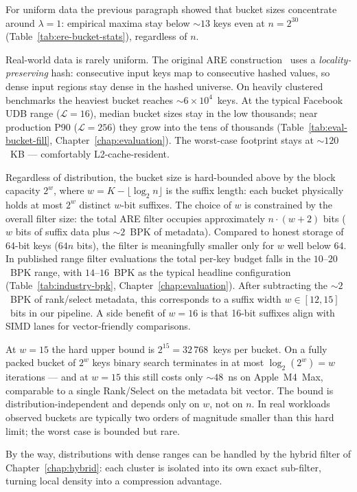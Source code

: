 For uniform data the previous paragraph showed that bucket sizes
concentrate around $\lambda = 1$: empirical maxima stay below
${\sim}13$ keys even at $n = 2^{30}$
(Table~\ref{tab:ere-bucket-stats}), regardless of $n$.

Real-world data is rarely uniform.
The original ARE construction~\citep{goswami2015approximate} uses a \emph{locality-preserving}
hash: consecutive input keys map to consecutive hashed values, so dense
input regions stay dense in the hashed universe.
On heavily clustered benchmarks the heaviest bucket reaches ${\sim}6 \times 10^4$~keys.
At the typical Facebook UDB range ($\mathcal{L} = 16$), median bucket
sizes stay in the low thousands; near production P90 ($\mathcal{L} = 256$)
they grow into the tens of thousands
(Table~\ref{tab:eval-bucket-fill}, Chapter~\ref{chap:evaluation}).
The worst-case footprint stays at ${\sim}120$~KB --- comfortably
L2-cache-resident.

Regardless of distribution, the bucket size is hard-bounded above by
the block capacity $2^w$, where $w = K - \lfloor \log_2 n \rfloor$ is
the suffix length: each bucket physically holds at most $2^w$ distinct
$w$-bit suffixes.
The choice of $w$ is constrained by the overall
filter size: the total ARE filter occupies approximately
$n \cdot (w + 2)$ bits ($w$ bits of suffix data plus ${\sim}2$~BPK of
metadata).
Compared to honest storage of 64-bit keys ($64 n$ bits),
the filter is meaningfully smaller only for $w$ well below $64$.
In published range filter evaluations the total per-key budget falls
in the $10$--$20$~BPK range, with $14$--$16$~BPK as the typical
headline configuration (Table~\ref{tab:industry-bpk},
Chapter~\ref{chap:evaluation}).
After subtracting the ${\sim}2$~BPK of rank/select metadata, this
corresponds to a suffix width $w \in [12, 15]$~bits in our pipeline.
A side benefit of $w = 16$ is that 16-bit suffixes align with SIMD
lanes for vector-friendly comparisons.

At $w = 15$ the hard upper bound is $2^{15} = 32\,768$~keys per bucket.
On a fully packed bucket of $2^w$ keys binary search terminates in at most
$\log_2(2^w) = w$ iterations --- and at $w = 15$ this still costs only
${\sim}48$~ns on Apple~M4~Max, comparable to a single Rank/Select on the metadata bit
vector.
The bound is distribution-independent and depends only on $w$,
not on $n$.
In real workloads observed buckets are typically two orders of
magnitude smaller than this hard limit; the worst case is bounded
but rare.

By the way, distributions with dense ranges can be handled by the hybrid filter of
Chapter~\ref{chap:hybrid}: each cluster is isolated into its own exact
sub-filter, turning local density into a compression advantage.

